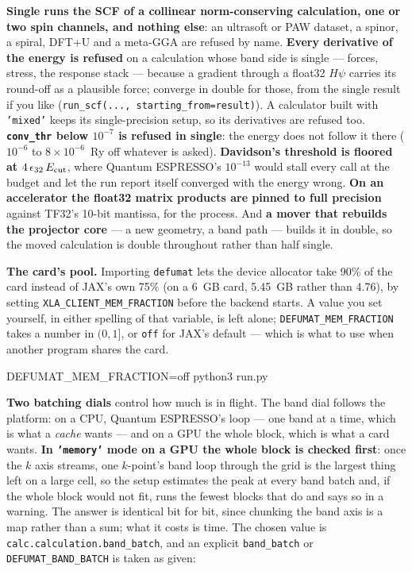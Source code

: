 \documentclass[11pt,a4paper]{article}
\newcommand{\qe}{Quantum ESPRESSO}
\newcommand{\code}[1]{\texttt{\small #1}}
\begin{document}
\begin{refuses}
\textbf{Single runs the SCF of a collinear norm-conserving calculation, one or two
spin channels, and nothing else}: an ultrasoft or PAW dataset, a spinor, a spiral,
DFT+U and a meta-GGA are refused by name. \textbf{Every derivative of the energy is
refused} on a calculation whose band side is single --- forces, stress, the
response stack --- because a gradient through a float32 $H\psi$ carries its
round-off as a plausible force; converge in double for those, from the single
result if you like (\code{run\_scf(..., starting\_from=result)}). A calculator built
with \code{'mixed'} keeps its single-precision setup, so its derivatives are refused
too. \textbf{\code{conv\_thr} below $10^{-7}$ is refused in single}: the energy does
not follow it there ($10^{-6}$ to $8\times10^{-6}$~Ry off whatever is asked).
\textbf{Davidson's threshold is floored at $4\,\epsilon_{32}\,E_{\rm cut}$}, where
\qe's $10^{-13}$ would stall every call at the budget and let the run report itself
converged with the energy wrong. \textbf{On an accelerator the float32 matrix
products are pinned to full precision} against TF32's 10-bit mantissa, for the
process. And \textbf{a mover that rebuilds the projector core} --- a new geometry,
a band path --- builds it in double, so the moved calculation is double throughout
rather than half single.
\end{refuses}

\textbf{The card's pool.} Importing \code{defumat} lets the device allocator take
90\% of the card instead of JAX's own 75\% (on a 6~GB card, 5.45~GB rather than
4.76), by setting \code{XLA\_CLIENT\_MEM\_FRACTION} before the backend starts.
A value you set yourself, in either spelling of that variable, is left alone;
\code{DEFUMAT\_MEM\_FRACTION} takes a number in $(0, 1]$, or \code{off} for
JAX's default --- which is what to use when another program shares the card.

\begin{shcode}
DEFUMAT_MEM_FRACTION=off python3 run.py
\end{shcode}

\textbf{Two batching dials} control how much is in flight. The band dial
follows the platform: on a CPU, \qe's loop --- one band at a time, which is what
a \emph{cache} wants --- and on a GPU the whole block, which is what a card
wants. \textbf{In \code{'memory'} mode on a GPU the whole block is checked
first}: once the $k$ axis streams, one $k$-point's band loop through the grid
is the largest thing left on a large cell, so the setup estimates the peak at
every band batch and, if the whole block would not fit, runs the fewest blocks
that do and says so in a warning. The answer is identical bit for bit, since
chunking the band axis is a map rather than a sum; what it costs is time. The
chosen value is \code{calc.calculation.band\_batch}, and an explicit
\code{band\_batch} or \code{DEFUMAT\_BAND\_BATCH} is taken as given:
\end{document}
